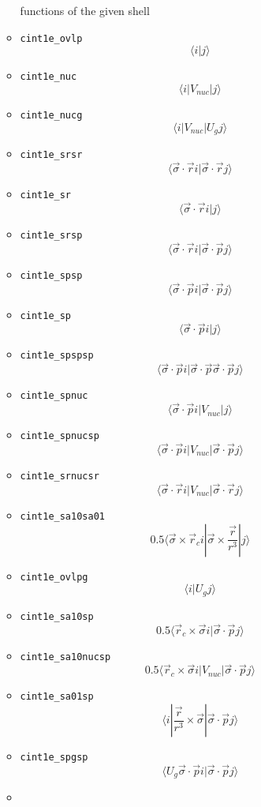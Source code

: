 \documentclass{article}
\begin{document}
\begin{itemize}
\begin{itemize}
    functions of the given shell
  \item
    \verb!cint1e_ovlp! \[\langle  i| j\rangle \]
  \item
    \verb!cint1e_nuc! \[\langle  i| V_{nuc} |j\rangle \]
  \item
    \verb!cint1e_nucg! \[\langle  i| V_{nuc} | U_gj\rangle \]
  \item
    \verb!cint1e_srsr!
    \[\langle \vec{\sigma}\cdot\vec{r} i| \vec{\sigma}\cdot\vec{r}j\rangle \]
  \item
    \verb!cint1e_sr! \[\langle \vec{\sigma}\cdot\vec{r} i|j\rangle \]
  \item
    \verb!cint1e_srsp!
    \[\langle \vec{\sigma}\cdot\vec{r} i| \vec{\sigma}\cdot\vec{p}j\rangle \]
  \item
    \verb!cint1e_spsp!
    \[\langle \vec{\sigma}\cdot\vec{p} i| \vec{\sigma}\cdot\vec{p}j\rangle \]
  \item
    \verb!cint1e_sp! \[\langle \vec{\sigma}\cdot\vec{p} i|j\rangle \]
  \item
    \verb!cint1e_spspsp!
    \[\langle \vec{\sigma}\cdot\vec{p} i| \vec{\sigma}\cdot\vec{p} \vec{\sigma}\cdot\vec{p}j\rangle \]
  \item
    \verb!cint1e_spnuc!
    \[\langle \vec{\sigma}\cdot\vec{p} i| V_{nuc} |j\rangle \]
  \item
    \verb!cint1e_spnucsp!
    \[\langle \vec{\sigma}\cdot\vec{p} i| V_{nuc} | \vec{\sigma}\cdot\vec{p}j\rangle \]
  \item
    \verb!cint1e_srnucsr!
    \[\langle \vec{\sigma}\cdot\vec{r} i| V_{nuc} | \vec{\sigma}\cdot\vec{r}j\rangle \]
  \item
    \verb!cint1e_sa10sa01!
    \[0.5\langle\vec{\sigma} \times \vec{r}_c i|\vec{\sigma} \times \frac{\vec{r}}{r^3} |j\rangle \]
  \item
    \verb!cint1e_ovlpg! \[\langle i|U_g j\rangle \]
  \item
    \verb!cint1e_sa10sp!
    \[0.5\langle\vec{r}_c \times\vec{\sigma} i| \vec{\sigma}\cdot\vec{p}j\rangle \]
  \item
    \verb!cint1e_sa10nucsp!
    \[0.5\langle\vec{r}_c \times\vec{\sigma} i| V_{nuc} | \vec{\sigma}\cdot\vec{p}j\rangle \]
  \item
    \verb!cint1e_sa01sp!
    \[\langle i| \frac{\vec{r}}{r^3} \times\vec{\sigma} | \vec{\sigma}\cdot\vec{p}j\rangle \]
  \item
    \verb!cint1e_spgsp!
    \[\langle U_g \vec{\sigma}\cdot\vec{p} i| \vec{\sigma}\cdot\vec{p}j\rangle \]
  \item

\end{itemize}
\end{itemize}
\end{document}
